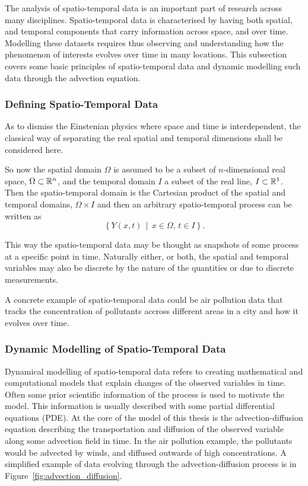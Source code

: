 The analysis of spatio-temporal data is an important part of research across many disciplines.
Spatio-temporal data is characterised by having both spatial, and temporal components that carry information across space, and over time.
Modelling these datasets requires thus observing and understanding how the phenomenon of interests evolves over time in many locations.
This subsection covers some basic principles of spatio-temporal data and dynamic modelling such data through the advection equation. 

\subsubsection{Defining Spatio-Temporal Data}
As to dismiss the Einstenian physics where space and time is interdependent, the classical way of separating the real spatial and temporal dimensions shall be considered here.

So now the spatial domain $\Omega$ is assumed to be a subset of $n$-dimensional real space, $\Omega \subset \mathbb{R}^n$, and the temporal domain $I$ a subset of the real line, $I \subset \mathbb{R}^1$.
Then the spatio-temporal domain is the Cartesian product of the spatial and temporal domains, $\Omega \times I$ and then an arbitrary spatio-temporal process can be written as
\begin{equation}
    \left\{ Y(x, t) \, \middle\vert \, x \in \Omega, \, t \in I \right\}.
\end{equation}

This way the spatio-temporal data may be thought as snapshots of some process at a specific point in time.
Naturally either, or both, the spatial and temporal variables may also be discrete by the nature of the quantities or due to discrete measurements.

A concrete example of spatio-temporal data could be air pollution data that tracks the concentration of pollutants accross different areas in a city and how it evolves over time.

\subsubsection{Dynamic Modelling of Spatio-Temporal Data}\label{subsubsection:dynamicmodellingspatiotemporaldata}
Dynamical modelling of spatio-temporal data refers to creating mathematical and computational models that explain changes of the observed variables in time.
Often some prior scientific information of the process is used to motivate the model.
This information is usually described with some partial differential equations (PDE).
At the core of the model of this thesis is the advection-diffusion equation describing the transportation and diffusion of the observed variable along some advection field in time.
In the air pollution example, the pollutants would be advected by winds, and diffused outwards of high concentrations.
A simplified example of data evolving through the advection-diffusion process is in Figure~\ref{fig:advection_diffusion}.

